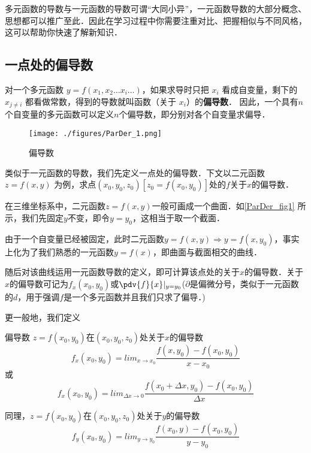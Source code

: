 
多元函数的导数与一元函数的导数可谓“大同小异”，一元函数导数的大部分概念、思想都可以推广至此．因此在学习过程中你需要注重对比、把握相似与不同风格，这可以帮助你快速了解新知识．

\subsection{一点处的偏导数}
对一个多元函数 $y = f(x_1, x_2 \dots x_i \dots)$，如果求导时只把 $x_i$ 看成自变量，剩下的 $x_{j \ne i}$ 都看做常数，得到的导数就叫函数（关于 $x_i$）的\textbf{偏导数}． 因此，一个具有$n$个自变量的多元函数可以定义$n$个偏导数，即分别对各个自变量求偏导．

\begin{figure}[ht]
\centering
\texttt{[image: ./figures/ParDer\_1.png]}
\caption{偏导数} \label{ParDer_fig1}
\end{figure}

类似于一元函数的导数，我们先定义一点处的偏导数．下文以二元函数 $z=f(x,y)$ 为例，求点$(x_0,y_0,z_0) [z_0=f(x_0,y_0)]$处的$f$关于$x$的偏导数．

在三维坐标系中，二元函数$z=f(x,y)$一般可画成一个曲面．如\autoref{ParDer_fig1} 所示，我们先固定$y$不变，即令$y=y_0$，这相当于取一个截面．

由于一个自变量已经被固定，此时二元函数$y=f(x,y)\Rightarrow y=f(x,y_0)$，事实上化为了我们熟悉的一元函数$y=f(x)$，即曲面与截面相交的曲线．

随后对该曲线运用一元函数导数的定义，即可计算该点处的关于$x$的偏导数．关于$x$的偏导数可记为$f_x(x_0,y_0)$或$\pdv{f}{x}|_{y=y_0}$($\partial$是偏微分号，类似于一元函数的$d$，用于强调$f$是一个多元函数并且我们只求了偏导．)

更一般地，我们定义
\begin{definition}{偏导数}
$z=f(x_0,y_0)$在$(x_0,y_0,z_0)$处关于$x$的偏导数
\begin{equation}
f_x(x_0,y_0)=lim_{x\to x_0} \frac{f(x,y_0)-f(x_0,y_0)}{x-x_0}
\end{equation}
或
\begin{equation}
f_x(x_0,y_0)=lim_{\Delta x \to 0} \frac{f(x_0+\Delta x,y_0)-f(x_0,y_0)}{\Delta x}
\end{equation}

同理，$z=f(x_0,y_0)$在$(x_0,y_0,z_0)$处关于$y$的偏导数
\begin{equation}
f_y(x_0,y_0)=lim_{y\to y_0} \frac{f(x_0,y)-f(x_0,y_0)}{y-y_0}
\end{equation}
\end{definition}

